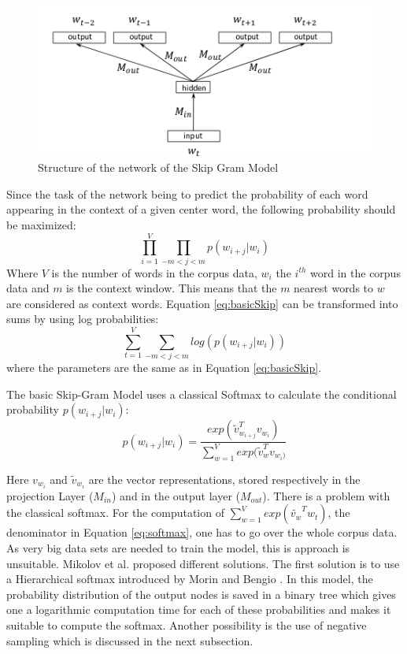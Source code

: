 \begin{figure}[ht]
\centering
\includegraphics[scale=0.625]{images/ntw_architecture}
\caption{Structure of the network of the Skip Gram Model}
\label{fig:ntw_architecture}
\end{figure}
Since the task of the network being to predict the probability of each word appearing in the context of a given center word, the following probability should be maximized:\\
\begin{equation} \label{eq:basicSkip}
\prod_{i=1}^V \prod_{-m<j<m} p(w_{i+j}|w_i)
\end{equation}
Where $V$ is the number of words in the corpus data, $w_i$ the $i^{th}$ word in the corpus data and $m$ is the context window. This means that the $m$ nearest words to $w$ are considered as context words.
Equation \ref{eq:basicSkip} can be transformed into sums by using log probabilities:
\begin{equation}
\sum _{t=1}^V \sum_{-m<j<m} log( p(w_{i+j}|w_i) )
\end{equation}
where the parameters are the same as in Equation \ref{eq:basicSkip}.

The basic Skip-Gram Model uses a classical Softmax to calculate the conditional probability $p(w_{i+j}|w_i)$:
\begin{equation} \label{eq:softmax}
p(w_{i+j}|w_i)= \frac{exp( \tilde{v}_{w_{i+j}}^Tv_{w_i})}{\sum_{w=1}^V exp(\tilde{v}_w^Tv_{ w_i)}}
\end{equation}

Here $ v_{w_i}$ and $\tilde{v}_{w_i}$ are the vector representations, stored respectively in the projection Layer ($M_{in}$) and in the output layer ($M_{out}$). There is a problem with the classical softmax. For the computation of $\sum_{w=1}^V exp(\tilde{v_w}^T w_t)$, the denominator in Equation \ref{eq:softmax}, one has to go over the whole corpus data. As very big data sets are needed to train the model, this is approach is unsuitable. Mikolov et al. \cite{mikolov2} proposed different solutions. The first solution is to use a Hierarchical softmax introduced by Morin and Bengio \cite{hsoftmax}. In this model, the probability distribution of the output nodes is saved in a binary tree which gives one a logarithmic computation time for each of these probabilities and makes it suitable to compute the softmax. Another possibility is the use of negative sampling which is discussed in the next subsection.

